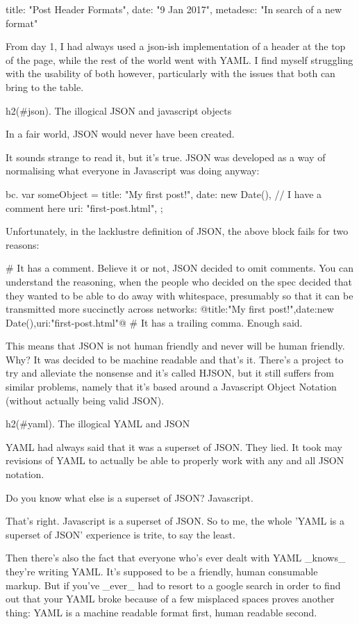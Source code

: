 {
	title: "Post Header Formats", 
	date: "9 Jan 2017",
	metadesc: "In search of a new format"
}

From day 1, I had always used a json-ish implementation of a header at the top of the page, while the rest of the world went with YAML. I find myself struggling with the usability of both however, particularly with the issues that both can bring to the table.

h2(#json). The illogical JSON and javascript objects

In a fair world, JSON would never have been created.

It sounds strange to read it, but it's true. JSON was developed as a way of normalising what everyone in Javascript was doing anyway:

bc. var someObject = {
	title: "My first post!",
	date: new Date(), // I have a comment here
	uri: "first-post.html",
};

Unfortunately, in the lacklustre definition of JSON, the above block fails for two reasons:

# It has a comment. Believe it or not, JSON decided to omit comments. You can understand the reasoning, when the people who decided on the spec decided that they wanted to be able to do away with whitespace, presumably so that it can be transmitted more succinctly across networks: @{title:"My first post!",date:new Date(),uri:"first-post.html"}@
# It has a trailing comma. Enough said.

This means that JSON is not human friendly and never will be human friendly. Why? It was decided to be machine readable and that's it. There's a project to try and alleviate the nonsense and it's called HJSON, but it still suffers from similar problems, namely that it's based around a Javascript Object Notation (without actually being valid JSON).

h2(#yaml). The illogical YAML and JSON

YAML had always said that it was a superset of JSON. They lied. It took may revisions of YAML to actually be able to properly work with any and all JSON notation.

Do you know what else is a superset of JSON? Javascript.

That's right. Javascript is a superset of JSON. So to me, the whole 'YAML is a superset of JSON' experience is trite, to say the least.

Then there's also the fact that everyone who's ever dealt with YAML _knows_ they're writing YAML. It's supposed to be a friendly, human consumable markup. But if you've _ever_ had to resort to a google search in order to find out that your YAML broke because of a few misplaced spaces proves another thing: YAML is a machine readable format first, human readable second. 

